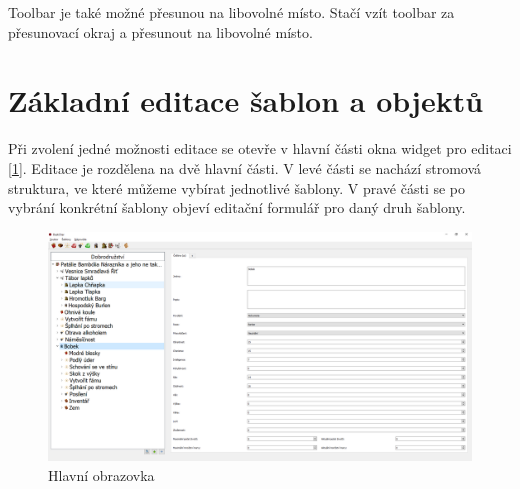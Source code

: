 \documentclass[12pt,a4paper,oneside]{article}
\begin{document}
Toolbar je také možné přesunou na libovolné místo. Stačí vzít toolbar za přesunovací okraj a přesunout na libovolné místo. 



\section{Základní editace šablon a objektů}
Při zvolení jedné možnosti editace se otevře v hlavní části okna widget pro editaci [\ref{fig:editace_all}]. Editace je rozdělena na dvě hlavní části. V levé části se nachází stromová struktura, ve které můžeme vybírat jednotlivé šablony. V pravé části se po vybrání konkrétní šablony objeví editační formulář pro daný druh šablony.
	\begin{figure}[h]
  		\centering
  		\begin{minipage}[t]{1\textwidth}
    		\includegraphics[width=\linewidth]{images/editace_all}
    		\caption{Hlavní obrazovka}
    		\label{fig:editace_all}
  		\end{minipage}
  		
  		\vfill
	\end{figure}
	
	 \newpage
\end{document}
